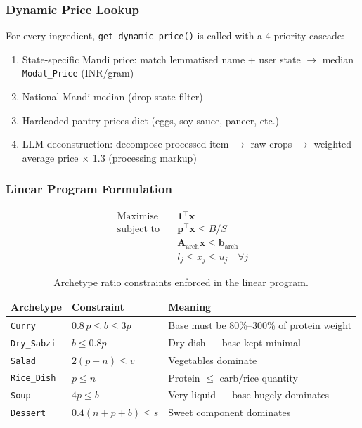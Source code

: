 \documentclass[12pt, a4paper]{article}
\begin{document}
\subsubsection{Dynamic Price Lookup}

For every ingredient, \texttt{get\_dynamic\_price()} is called with a 4-priority cascade:

\begin{enumerate}
  \item State-specific Mandi price: match lemmatised name + user state $\rightarrow$ median \texttt{Modal\_Price} (INR/gram)
  \item National Mandi median (drop state filter)
  \item Hardcoded pantry prices dict (eggs, soy sauce, paneer, etc.)
  \item LLM deconstruction: decompose processed item $\rightarrow$ raw crops $\rightarrow$ weighted average price $\times$ 1.3 (processing markup)
\end{enumerate}

\subsubsection{Linear Program Formulation}

\begin{align}
\text{Maximise} \quad & \mathbf{1}^\top \mathbf{x} \label{eq:lp_obj}\\
\text{subject to} \quad
& \mathbf{p}^\top \mathbf{x} \leq B / S \tag{budget} \label{eq:lp_budget}\\
& \mathbf{A}_{\text{arch}} \mathbf{x} \leq \mathbf{b}_{\text{arch}} \tag{archetype ratios} \label{eq:lp_arch}\\
& l_j \leq x_j \leq u_j \quad \forall j \tag{ingredient bounds} \label{eq:lp_bounds}
\end{align}

\begin{table}[H]
\centering
\caption{Archetype ratio constraints enforced in the linear program.}
\label{tab:arch_constraints}
\begin{tabularx}{\textwidth}{l l X}
\toprule
\textbf{Archetype} & \textbf{Constraint} & \textbf{Meaning} \\
\midrule
\texttt{Curry}     & $0.8\,p \le b \le 3p$     & Base must be 80\%--300\% of protein weight \\
\texttt{Dry\_Sabzi}& $b \le 0.8p$              & Dry dish --- base kept minimal \\
\texttt{Salad}     & $2(p+n) \le v$            & Vegetables dominate \\
\texttt{Rice\_Dish}& $p \le n$                 & Protein $\le$ carb/rice quantity \\
\texttt{Soup}      & $4p \le b$                & Very liquid --- base hugely dominates \\
\texttt{Dessert}   & $0.4(n+p+b) \le s$        & Sweet component dominates \\
\bottomrule
\end{tabularx}
\end{table}
\end{document}

